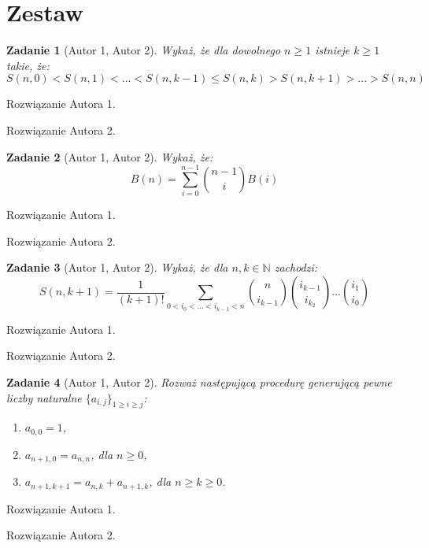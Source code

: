 \documentclass{mwart}
\newtheorem{zad}{Zadanie}[section]
\begin{document}
\newpage
\section{Zestaw}          %

\begin{zad}[Autor 1, Autor 2]
    Wykaż, że dla dowolnego $n \geq 1$ istnieje $k \geq 1$ takie, że:
    \[S(n, 0) < S(n, 1) < ... < S(n, k - 1 ) \leq S(n, k) > S(n, k+1) > ... > S(n, n)\]
\end{zad}
\begin{mdframed}
    Rozwiązanie Autora 1.
\end{mdframed}
\begin{mdframed}
    Rozwiązanie Autora 2.
\end{mdframed}




\begin{zad}[Autor 1, Autor 2]
    Wykaż, że:
    \[B(n) = \sum_{i=0}^{n-1} \binom{n-1}{i}B(i)\]
\end{zad}
\begin{mdframed}
    Rozwiązanie Autora 1.
\end{mdframed}
\begin{mdframed}
    Rozwiązanie Autora 2.
\end{mdframed}




\begin{zad}[Autor 1, Autor 2]
    Wykaż, że dla $n, k \in \mathbb{N}$ zachodzi:
    \[S(n,k+1)=\frac{1}{(k+1)!} \sum_{0<i_0<...<i_{k-1}<n} \binom{n}{i_{k-1}}\binom{i_{k-1}}{i_{k_2}}...\binom{i_1}{i_0}     \]
\end{zad}
\begin{mdframed}
    Rozwiązanie Autora 1.
\end{mdframed}
\begin{mdframed}
    Rozwiązanie Autora 2.
\end{mdframed}





\begin{zad}[Autor 1, Autor 2]
    Rozważ  następującą procedurę generującą pewne liczby naturalne
    $\{a_{i,j}\}_{1 \geq i \geq j}$:
    \begin{enumerate}
        \item $a_{0,0} = 1$,
        \item $a_{n+1, 0} = a_{n,n}$, dla $n \geq 0$,
        \item $a_{n+1, k+1} = a_{n, k} + a_{n+1, k}$, dla $n \geq k \geq 0$.
    \end{enumerate}
\end{zad}
\begin{mdframed}
    Rozwiązanie Autora 1.
\end{mdframed}
\begin{mdframed}
    Rozwiązanie Autora 2.
\end{mdframed}
\end{document}
